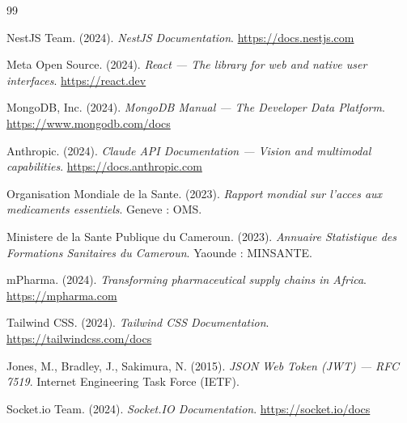 \documentclass[12pt,a4paper]{report}
\begin{document}
\begin{thebibliography}{99}

  NestJS Team. (2024). \textit{NestJS Documentation}.
  \url{https://docs.nestjs.com}

  Meta Open Source. (2024). \textit{React --- The library for web and native user interfaces}.
  \url{https://react.dev}

  MongoDB, Inc. (2024). \textit{MongoDB Manual --- The Developer Data Platform}.
  \url{https://www.mongodb.com/docs}

  Anthropic. (2024). \textit{Claude API Documentation --- Vision and multimodal capabilities}.
  \url{https://docs.anthropic.com}

  Organisation Mondiale de la Sante. (2023). \textit{Rapport mondial sur l'acces aux medicaments essentiels}. Geneve : OMS.

  Ministere de la Sante Publique du Cameroun. (2023). \textit{Annuaire Statistique des Formations Sanitaires du Cameroun}. Yaounde : MINSANTE.

  mPharma. (2024). \textit{Transforming pharmaceutical supply chains in Africa}.
  \url{https://mpharma.com}

  Tailwind CSS. (2024). \textit{Tailwind CSS Documentation}.
  \url{https://tailwindcss.com/docs}

  Jones, M., Bradley, J., Sakimura, N. (2015). \textit{JSON Web Token (JWT) --- RFC 7519}.
  Internet Engineering Task Force (IETF).

  Socket.io Team. (2024). \textit{Socket.IO Documentation}.
  \url{https://socket.io/docs}

\end{thebibliography}
\end{document}
